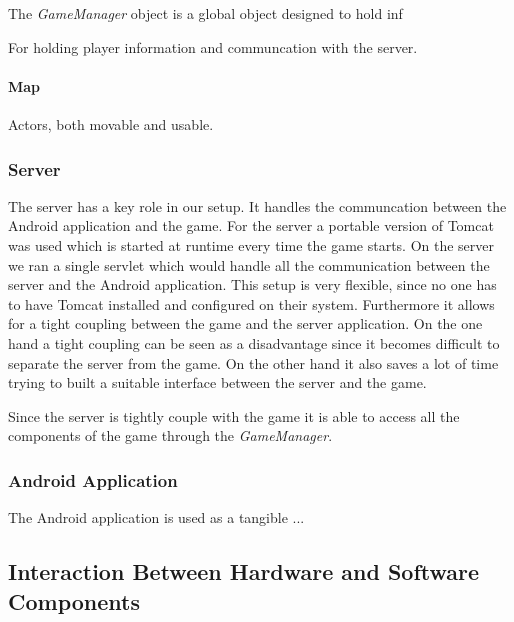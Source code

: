 \documentclass[a4paper,10pt]{article}
\begin{document}
		The \emph{GameManager} object is a global object designed to hold inf
		
		For holding player information and communcation with the server.
		
		
		\paragraph{Map}
		Actors, both movable and usable.
		
		
		\subsubsection{Server}
		The server has a key role in our setup.
		It handles the communcation between the Android application and the game.
		For the server a portable version of Tomcat was used which is started at runtime every time the game starts.
		On the server we ran a single servlet which would handle all the communication between the server and the Android application.
		This setup is very flexible, since no one has to have Tomcat installed and configured on their system.
		Furthermore it allows for a tight coupling between the game and the server application.
		On the one hand a tight coupling can be seen as a disadvantage since it becomes difficult to separate the server from the game.
		On the other hand it also saves a lot of time trying to built a suitable interface between the server and the game.
				
		Since the server is tightly couple with the game it is able to access all the components of the game through the \emph{GameManager}.
		
		\subsubsection{Android Application}
		The Android application is used as a tangible ...
		
		
		
	\subsection{Interaction Between Hardware and Software Components}
	
\end{document}
